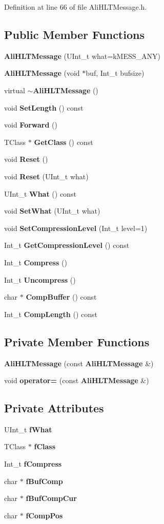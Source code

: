 Definition at line 66 of file Ali\-HLTMessage.h.\subsection*{Public Member Functions}
\begin{CompactItemize}
\item 
{\bf Ali\-HLTMessage} (UInt\_\-t what=k\-MESS\_\-ANY)
\item 
{\bf Ali\-HLTMessage} (void $\ast$buf, Int\_\-t bufsize)
\item 
virtual {\bf $\sim$Ali\-HLTMessage} ()
\item 
void {\bf Set\-Length} () const 
\item 
void {\bf Forward} ()
\item 
TClass $\ast$ {\bf Get\-Class} () const 
\item 
void {\bf Reset} ()
\item 
void {\bf Reset} (UInt\_\-t what)
\item 
UInt\_\-t {\bf What} () const 
\item 
void {\bf Set\-What} (UInt\_\-t what)
\item 
void {\bf Set\-Compression\-Level} (Int\_\-t level=1)
\item 
Int\_\-t {\bf Get\-Compression\-Level} () const 
\item 
Int\_\-t {\bf Compress} ()
\item 
Int\_\-t {\bf Uncompress} ()
\item 
char $\ast$ {\bf Comp\-Buffer} () const 
\item 
Int\_\-t {\bf Comp\-Length} () const 
\end{CompactItemize}
\subsection*{Private Member Functions}
\begin{CompactItemize}
\item 
{\bf Ali\-HLTMessage} (const {\bf Ali\-HLTMessage} \&)
\item 
void {\bf operator=} (const {\bf Ali\-HLTMessage} \&)
\end{CompactItemize}
\subsection*{Private Attributes}
\begin{CompactItemize}
\item 
UInt\_\-t {\bf f\-What}
\item 
TClass $\ast$ {\bf f\-Class}
\item 
Int\_\-t {\bf f\-Compress}
\item 
char $\ast$ {\bf f\-Buf\-Comp}
\item 
char $\ast$ {\bf f\-Buf\-Comp\-Cur}
\item 
char $\ast$ {\bf f\-Comp\-Pos}
\end{CompactItemize}


